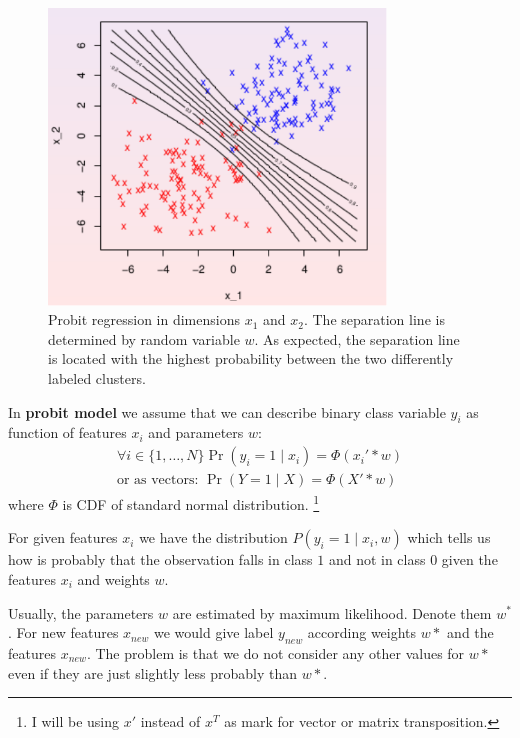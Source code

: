 \begin{figure}[!hb]
\centering
\includegraphics[width=0.8\textwidth]{probit2D}
\caption{Probit regression in dimensions $x_1$ and $x_2$. The separation line is determined by random variable $w$. As expected, the separation line is located with the highest probability between the two differently labeled clusters.}
\label{fig:probit2D}
\end{figure}

\begin{defn}
    In {\bf probit model} we assume that we can describe binary class variable $y_i$ as function of features $x_i$ and parameters $w$:
\begin{align}
    \forall i\in\{1,\ldots,N\} \Pr(y_i=1 \mid x_i) = \Phi(x_i' * w) \\
    \text{or as vectors: } \Pr(Y=1 \mid X) = \Phi(X' * w)
\end{align}
where $\Phi$ is CDF of standard normal distribution.
\footnote{I will be using $x'$ instead of $x^T$ as mark for vector or matrix transposition.}
\end{defn}

For given features $x_i$ we have the distribution $P(y_i=1 \mid x_i, w)$ which tells us how is probably that the observation falls in class $1$ and not in class $0$ given the features $x_i$ and weights $w$.

Usually, the parameters $w$ are estimated by maximum likelihood. Denote them $w^*$. For new features $x_{new}$ we would give label $y_{new}$ according weights $w*$ and the features $x_{new}$. The problem is that we do not consider any other values for $w*$ even if they are just slightly less probably than $w*$. 

